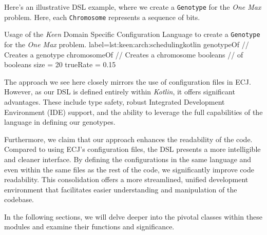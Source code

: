     Here's an illustrative DSL example, where we create a \texttt{Genotype} for the \textit{One Max} problem. Here, each \texttt{Chromosome} represents a sequence of bits.

    \begin{code}{
        Usage of the \textit{Keen} Domain Specific Configuration Language to create a \texttt{Genotype} for the 
        \textit{One Max} problem.
    }{label={lst:keen:arch:scheduling}}{kotlin}
        genotypeOf {        // Creates a genotype
            chromosomeOf {  // Creates a chromosome
                booleans {  // of booleans
                    size = 20
                    trueRate = 0.15
                }
            }
        }
    \end{code}

    The approach we see here closely mirrors the use of configuration files in ECJ. However, as our DSL is defined entirely within \textit{Kotlin}, it offers significant advantages. These include type safety, robust Integrated Development Environment (IDE) support, and the ability to leverage the full capabilities of the language in defining our genotypes.
    
    Furthermore, we claim that our approach enhances the readability of the code. Compared to using ECJ's configuration files, the DSL presents a more intelligible and cleaner interface.
    By defining the configurations in the same language and even within the same files as the rest of the code, we significantly improve code readability.
    This consolidation offers a more streamlined, unified development environment that facilitates easier understanding and manipulation of the codebase.

    In the following sections, we will delve deeper into the pivotal classes within these modules and examine their functions and significance.
